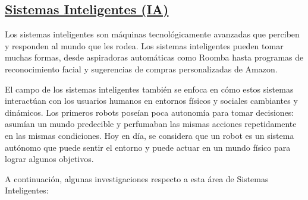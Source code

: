 \documentclass[10pt,conference]{IEEEtran}
\begin{document}
\subsection{\underline{\textbf{Sistemas Inteligentes (IA)}}}
Los sistemas inteligentes son máquinas tecnológicamente avanzadas que perciben y responden al mundo que les rodea. Los sistemas inteligentes pueden tomar muchas formas, desde aspiradoras automáticas como Roomba hasta programas de reconocimiento facial y sugerencias de compras personalizadas de Amazon.\citep{systems}
\par El campo de los sistemas inteligentes también se enfoca en cómo estos sistemas interactúan con los usuarios humanos en entornos físicos y sociales cambiantes y dinámicos. Los primeros robots poseían poca autonomía para tomar decisiones: asumían un mundo predecible y perfumaban las mismas acciones repetidamente en las mismas condiciones. Hoy en día, se considera que un robot es un sistema autónomo que puede sentir el entorno y puede actuar en un mundo físico para lograr algunos objetivos.
\par A continuación, algunas investigaciones respecto a esta área de Sistemas Inteligentes:
\end{document}
